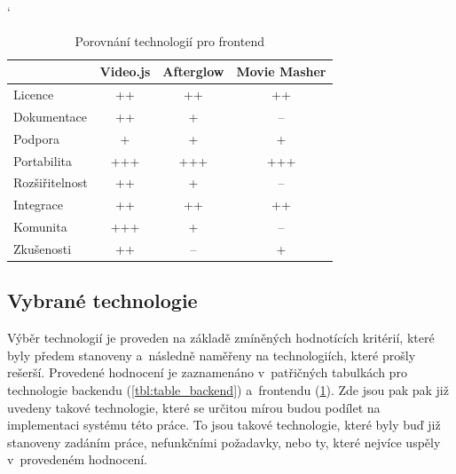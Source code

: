 \documentclass[thesis=M,czech]{FITthesis}[2012/06/26]
\begin{document}
\begin{table}[]
\catcode` %
\centering
\begin{tabular}{l|l|l|l|}
\cline{2-4}
\multicolumn{1}{c|}{}                 & \multicolumn{1}{c|}{Video.js} & \multicolumn{1}{c|}{Afterglow} & \multicolumn{1}{c|}{Movie Masher} \\ \hline
\multicolumn{1}{|l|}{Licence}        & \multicolumn{1}{c|}{++}      & \multicolumn{1}{c|}{++}        & \multicolumn{1}{c|}{++}         \\ \hline
\multicolumn{1}{|l|}{Dokumentace}    & \multicolumn{1}{c|}{++}      & \multicolumn{1}{c|}{+}         & \multicolumn{1}{c|}{--}                                      \\ \hline
\multicolumn{1}{|l|}{Podpora}        & \multicolumn{1}{c|}{+}       & \multicolumn{1}{c|}{+}         & \multicolumn{1}{c|}{+}                                      \\ \hline
\multicolumn{1}{|l|}{Portabilita}    & \multicolumn{1}{c|}{+++}     & \multicolumn{1}{c|}{+++}       & \multicolumn{1}{c|}{+++}                                    \\ \hline
\multicolumn{1}{|l|}{Rozšiřitelnost} & \multicolumn{1}{c|}{++}      & \multicolumn{1}{c|}{+}         & \multicolumn{1}{c|}{--}                                      \\ \hline
\multicolumn{1}{|l|}{Integrace}      & \multicolumn{1}{c|}{++}      & \multicolumn{1}{c|}{++}        & \multicolumn{1}{c|}{++}                                      \\ \hline
\multicolumn{1}{|l|}{Komunita}       & \multicolumn{1}{c|}{+++}     & \multicolumn{1}{c|}{+}         & \multicolumn{1}{c|}{--}                                      \\ \hline
\multicolumn{1}{|l|}{Zkušenosti}     & \multicolumn{1}{c|}{++}      & \multicolumn{1}{c|}{--}         & \multicolumn{1}{c|}{+}                                      \\ \hline
\end{tabular}
\caption{Porovnání technologií pro frontend}
\label{tbl:table_frontend}
\end{table}


\subsection{Vybrané technologie} \label{subsec:analyza_technologie_vybrane}

Výběr technologií je proveden na základě zmíněných hodnotících kritérií, které byly předem stanoveny a~následně naměřeny na technologiích, které prošly rešerší. Provedené hodnocení je zaznamenáno v~patřičných tabulkách pro technologie backendu (\ref{tbl:table_backend}) a~frontendu (\ref{tbl:table_frontend}). Zde jsou pak pak již uvedeny takové technologie, které se určitou mírou budou podílet na implementaci systému této práce. To jsou takové technologie, které byly buď již stanoveny zadáním práce, nefunkčními požadavky, nebo ty, které nejvíce uspěly v~provedeném hodnocení.
	
\end{document}
